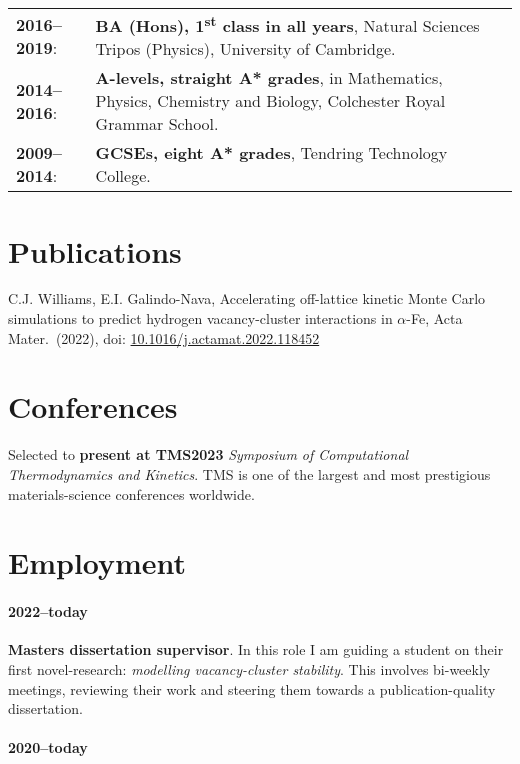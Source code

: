 \documentclass[11pt]{article}
\begin{document}
\begin{tabular}{@{}lp{}@{}}
    \textbf{2016--2019}:  & \textbf{BA (Hons), 1\textsuperscript{st} class in all years}, Natural Sciences Tripos (Physics), University of Cambridge. \\
    
    \textbf{2014--2016}:  & \textbf{A-levels, straight A* grades}, in Mathematics, Physics, Chemistry and Biology, Colchester Royal Grammar School.   \\
    
    \textbf{2009--2014}:  & \textbf{GCSEs, eight A* grades}, Tendring Technology College.
    
\end{tabular}

\section*{Publications}

C.J. Williams, E.I. Galindo-Nava, Accelerating off-lattice kinetic Monte Carlo
simulations to predict hydrogen vacancy-cluster interactions in $\alpha$-Fe, Acta Mater.\ (2022), doi:
\href{https://doi.org/10.1016/j.actamat.2022.118452}{10.1016/j.actamat.2022.118452}

\section*{Conferences}

Selected to \textbf{present at TMS2023} \emph{Symposium of Computational Thermodynamics and Kinetics}. TMS is one of the largest and most prestigious materials-science conferences worldwide.

\pagebreak

\section*{Employment}

\paragraph*{2022--today} \textbf{Masters dissertation supervisor}. In this role I am guiding a student on their first novel-research: \emph{modelling vacancy-cluster stability}. This involves bi-weekly meetings, reviewing their work and steering them towards a publication-quality dissertation. 

\paragraph*{2020--today}
\end{document}
